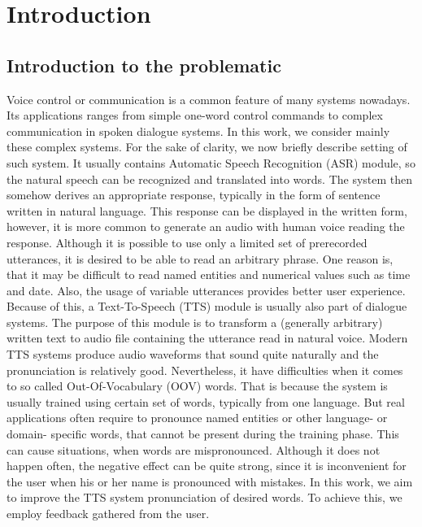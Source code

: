 \chapter{Introduction}

\section{Introduction to the problematic}
Voice control or communication is a common feature of many systems nowadays.
Its applications ranges from simple one-word control commands to complex communication in spoken dialogue systems.
In this work, we consider mainly these complex systems.
For the sake of clarity, we now briefly describe setting of such system.
It usually contains Automatic Speech Recognition (ASR) module, so the natural speech can be recognized and translated into words.
The system then somehow derives an appropriate response, typically in the form of sentence written in natural language.
This response can be displayed in the written form, however, it is more common to generate an audio with human voice reading the response.
Although it is possible to use only a limited set of prerecorded utterances, it is desired to be able to read an arbitrary phrase.
One reason is, that it may be difficult to read named entities and numerical values such as time and date.
Also, the usage of variable utterances provides better user experience.
Because of this, a Text-To-Speech (TTS) module is usually also part of dialogue systems.
The purpose of this module is to transform a (generally arbitrary) written text to audio file containing the utterance read in natural voice.
Modern TTS systems produce audio waveforms that sound quite naturally and the pronunciation is relatively good.
Nevertheless, it have difficulties when it comes to  so called Out-Of-Vocabulary (OOV) words.
That is because the system is usually trained using certain set of words, typically from one language.
But real applications often require to pronounce named entities or other language- or domain- specific words, that cannot be present during the training phase.
This can cause situations, when words are mispronounced.
Although it does not happen often, the negative effect can be quite strong, since it is inconvenient for the user when his or her name is pronounced with mistakes.
\linebreak\linebreak
In this work, we aim to improve the TTS system pronunciation of desired words.
To achieve this, we employ feedback gathered from the user.
